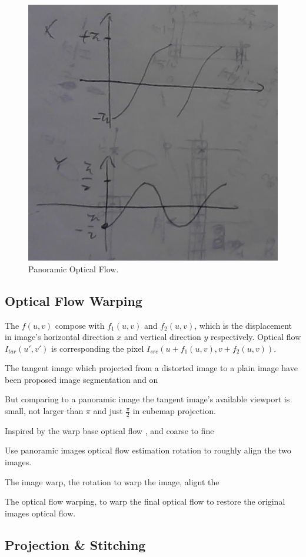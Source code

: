 \begin{figure}[hbt!]
	\centering
	\includegraphics[width=0.45\linewidth]{images/wrap-around-0.jpg}
	\caption{Panoramic Optical Flow.}
	\label{fig:app:warparound}
\end{figure}


\subsection{Optical Flow Warping}
\label{sec:approach:warping}

The $f(u,v)$ compose with $f_1(u,v)$ and $f_2(u,v)$, which is the displacement in image's horizontal direction $x$ and vertical direction $y$ respectively.
Optical flow 
$I_{tar}(u',v')$ is corresponding the pixel $I_{src}(u + f_1(u,v), v + f_2(u,v))$.


The tangent image which projected from a distorted image to a plain image have been proposed image segmentation and on \cite{eldercvpr2020} 

But comparing to a panoramic image the tangent image's available viewport is small, not larger than $\pi$ and just $\frac{\pi}{2}$ in cubemap projection.

Inspired by the warp base optical flow \cite{?}, and coarse to fine 

Use panoramic images optical flow estimation rotation to roughly align the two images.


The image warp, the rotation to warp the image, alignt the 

The optical flow warping, to warp the final optical flow to restore the original images optical flow.


\subsection{Projection \& Stitching}
\label{sec:approach:projstit}

